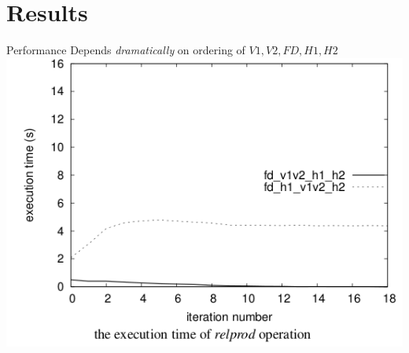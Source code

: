 \documentclass{beamer}
\begin{document}
\section{Results}
\begin{frame}{Performance}
Depends \emph{dramatically} on ordering of $V1, V2, FD, H1, H2$ \\
\includegraphics[scale=0.4]{domain-arrangement.png}
\end{frame}
\end{document}

